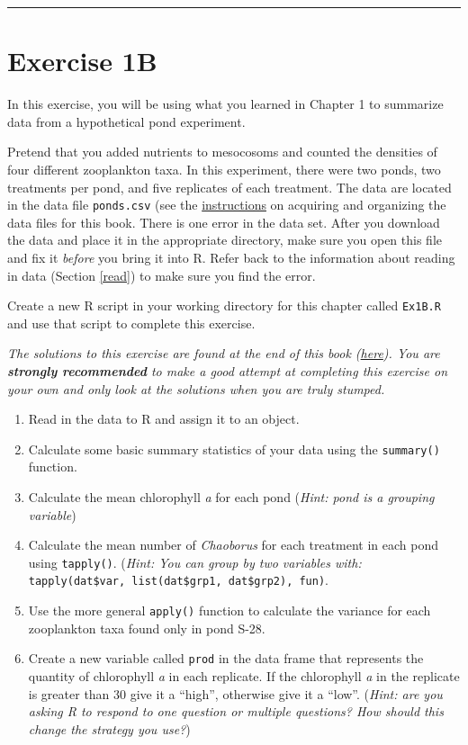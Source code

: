 \documentclass[]{book}
\providecommand{\tightlist}{%
  \setlength{\itemsep}{0pt}\setlength{\parskip}{0pt}}
\theoremstyle{definition}
\theoremstyle{definition}
\theoremstyle{definition}
\theoremstyle{remark}
\begin{document}
\begin{center}\rule{0.5\linewidth}{\linethickness}\end{center}

\hypertarget{ex1b}{\section*{Exercise 1B}\label{ex1b}}

In this exercise, you will be using what you learned in Chapter 1 to
summarize data from a hypothetical pond experiment.

Pretend that you added nutrients to mesocosoms and counted the densities
of four different zooplankton taxa. In this experiment, there were two
ponds, two treatments per pond, and five replicates of each treatment.
The data are located in the data file \texttt{ponds.csv} (see the
\protect\hyperlink{data-sets}{instructions} on acquiring and organizing
the data files for this book. There is one error in the data set. After
you download the data and place it in the appropriate directory, make
sure you open this file and fix it \emph{before} you bring it into R.
Refer back to the information about reading in data (Section \ref{read})
to make sure you find the error.

Create a new R script in your working directory for this chapter called
\texttt{Ex1B.R} and use that script to complete this exercise.

\emph{The solutions to this exercise are found at the end of this book
(\protect\hyperlink{ex1b-answers}{here}). You are \textbf{strongly
recommended} to make a good attempt at completing this exercise on your
own and only look at the solutions when you are truly stumped.}

\begin{enumerate}
\def\labelenumi{\arabic{enumi}.}
\tightlist
\item
  Read in the data to R and assign it to an object.
\item
  Calculate some basic summary statistics of your data using the
  \texttt{summary()} function.
\item
  Calculate the mean chlorophyll \emph{a} for each pond (\emph{Hint:
  pond is a grouping variable})
\item
  Calculate the mean number of \emph{Chaoborus} for each treatment in
  each pond using \texttt{tapply()}. (\emph{Hint: You can group by two
  variables with:}
  \texttt{tapply(dat\$var,\ list(dat\$grp1,\ dat\$grp2),\ fun)}.
\item
  Use the more general \texttt{apply()} function to calculate the
  variance for each zooplankton taxa found only in pond S-28.
\item
  Create a new variable called \texttt{prod} in the data frame that
  represents the quantity of chlorophyll \emph{a} in each replicate. If
  the chlorophyll \emph{a} in the replicate is greater than 30 give it a
  ``high'', otherwise give it a ``low''. (\emph{Hint: are you asking R
  to respond to one question or multiple questions? How should this
  change the strategy you use?})
\end{enumerate}
\end{document}
